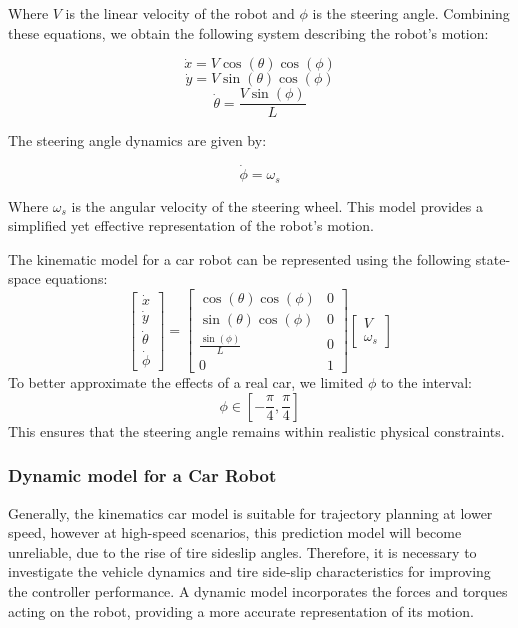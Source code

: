 \documentclass[12pt]{article}
\begin{document}
Where $V$ is the linear velocity of the robot and $\phi$ is the steering angle. Combining these equations, we obtain the following system describing the robot’s motion:

\[
\dot{x} = V \cos(\theta) \cos(\phi)
\]
\[
\dot{y} = V \sin(\theta) \cos(\phi)
\]
\[
\dot{\theta} = \frac{V \sin(\phi)}{L}
\]

The steering angle dynamics are given by:

\[
\dot{\phi} = \omega_s
\]

Where $\omega_s$ is the angular velocity of the steering wheel. This model provides a simplified yet effective representation of the robot's motion.


The kinematic model for a car robot can be represented using the following state-space equations:
\[
\begin{bmatrix}
\dot{x} \\
\dot{y} \\
\dot{\theta} \\
\dot{\phi}
\end{bmatrix}
=
\begin{bmatrix}
\cos(\theta)\cos(\phi) & 0 \\
\sin(\theta)\cos(\phi) & 0 \\
\frac{\sin(\phi)}{L} & 0 \\
0 & 1
\end{bmatrix}
\begin{bmatrix}
V \\
\omega_s
\end{bmatrix}
\]
To better approximate the effects of a real car, we limited $\phi$ to the interval:
\[
\phi \in \left[-\frac{\pi}{4}, \frac{\pi}{4}\right]
\]
This ensures that the steering angle remains within realistic physical constraints.

\subsubsection{Dynamic model for a Car Robot}

Generally, the kinematics car model is suitable for trajectory planning at lower speed, however at high-speed scenarios, this prediction model will become unreliable, due to the rise of tire sideslip angles. Therefore, it is necessary to investigate the vehicle dynamics and tire side-slip characteristics for improving the controller performance. A dynamic model incorporates the forces and torques acting on the robot, providing a more accurate representation of its motion.
\end{document}
